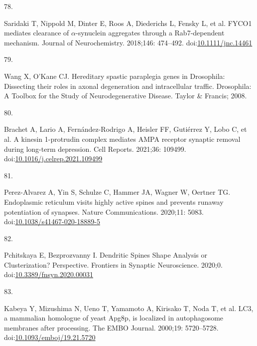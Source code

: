 \documentclass[
  12pt,
  a4paper,
]{book}
\newlength{\cslhangindent}
\newlength{\csllabelwidth}
\newlength{\cslentryspacingunit} %
\newenvironment{CSLReferences}[2] %
 {%
  \setlength{\parindent}{0pt}
  \ifodd #1
  \let\oldpar\par
  \def\par{\hangindent=\cslhangindent\oldpar}
  \fi
  \setlength{\parskip}{#2\cslentryspacingunit}
 }%
 {}
\newcommand{\CSLLeftMargin}[1]{\parbox[t]{\csllabelwidth}{#1}}
\newcommand{\CSLRightInline}[1]{\parbox[t]{\linewidth - \csllabelwidth}{#1}\break}
\begin{document}
\begin{CSLReferences}{0}{0}
\leavevmode{}%
\CSLLeftMargin{78. }%
\CSLRightInline{Saridaki T, Nippold M, Dinter E, Roos A, Diederichs L, Fensky L, et al. {FYCO1} mediates clearance of {\(\alpha\)}-synuclein aggregates through a {Rab7-dependent} mechanism. Journal of Neurochemistry. 2018;146: 474--492. doi:\href{https://doi.org/10.1111/jnc.14461}{10.1111/jnc.14461}}

\leavevmode{}%
\CSLLeftMargin{79. }%
\CSLRightInline{Wang X, O'Kane CJ. Hereditary spastic paraplegia genes in {Drosophila}: Dissecting their roles in axonal degeneration and intracellular traffic. Drosophila: {A Toolbox} for the {Study} of {Neurodegenerative Disease}. {Taylor \& Francis}; 2008. }

\leavevmode{}%
\CSLLeftMargin{80. }%
\CSLRightInline{Brachet A, Lario A, Fernández-Rodrigo A, Heisler FF, Gutiérrez Y, Lobo C, et al. A kinesin 1-protrudin complex mediates {AMPA} receptor synaptic removal during long-term depression. Cell Reports. 2021;36: 109499. doi:\href{https://doi.org/10.1016/j.celrep.2021.109499}{10.1016/j.celrep.2021.109499}}

\leavevmode{}%
\CSLLeftMargin{81. }%
\CSLRightInline{Perez-Alvarez A, Yin S, Schulze C, Hammer JA, Wagner W, Oertner TG. Endoplasmic reticulum visits highly active spines and prevents runaway potentiation of synapses. Nature Communications. 2020;11: 5083. doi:\href{https://doi.org/10.1038/s41467-020-18889-5}{10.1038/s41467-020-18889-5}}

\leavevmode{}%
\CSLLeftMargin{82. }%
\CSLRightInline{Pchitskaya E, Bezprozvanny I. Dendritic {Spines Shape Analysis}\textemdash{{Classification}} or {Clusterization}? {Perspective}. Frontiers in Synaptic Neuroscience. 2020;0. doi:\href{https://doi.org/10.3389/fnsyn.2020.00031}{10.3389/fnsyn.2020.00031}}

\leavevmode{}%
\CSLLeftMargin{83. }%
\CSLRightInline{Kabeya Y, Mizushima N, Ueno T, Yamamoto A, Kirisako T, Noda T, et al. {LC3}, a mammalian homologue of yeast {Apg8p}, is localized in autophagosome membranes after processing. The EMBO Journal. 2000;19: 5720--5728. doi:\href{https://doi.org/10.1093/emboj/19.21.5720}{10.1093/emboj/19.21.5720}}


\end{CSLReferences}
\end{document}

